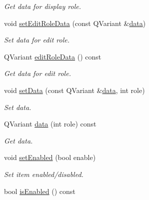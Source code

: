 \begin{DoxyCompactItemize}
\begin{DoxyCompactList}\small\item\em Get data for display role. \end{DoxyCompactList}\item 
void \hyperlink{class_mdt_1_1_item_model_1_1_variant_table_model_item_a10f83fac7538e913d9af5be304efd0ad}{set\+Edit\+Role\+Data} (const Q\+Variant \&\hyperlink{class_mdt_1_1_item_model_1_1_variant_table_model_item_af4c895c68f47b19a07e159325a31fbf3}{data})
\begin{DoxyCompactList}\small\item\em Set data for edit role. \end{DoxyCompactList}\item 
Q\+Variant \hyperlink{class_mdt_1_1_item_model_1_1_variant_table_model_item_a597cfa2f4f45268d09b8464f441ab44a}{edit\+Role\+Data} () const 
\begin{DoxyCompactList}\small\item\em Get data for edit role. \end{DoxyCompactList}\item 
void \hyperlink{class_mdt_1_1_item_model_1_1_variant_table_model_item_a1421ef37bdea6f7d8ca8843dd46e4063}{set\+Data} (const Q\+Variant \&\hyperlink{class_mdt_1_1_item_model_1_1_variant_table_model_item_af4c895c68f47b19a07e159325a31fbf3}{data}, int role)
\begin{DoxyCompactList}\small\item\em Set data. \end{DoxyCompactList}\item 
Q\+Variant \hyperlink{class_mdt_1_1_item_model_1_1_variant_table_model_item_af4c895c68f47b19a07e159325a31fbf3}{data} (int role) const 
\begin{DoxyCompactList}\small\item\em Get data. \end{DoxyCompactList}\item 
void \hyperlink{class_mdt_1_1_item_model_1_1_variant_table_model_item_a79cd7d959040926f118d26f263d4700f}{set\+Enabled} (bool enable)
\begin{DoxyCompactList}\small\item\em Set item enabled/disabled. \end{DoxyCompactList}\item 
bool \hyperlink{class_mdt_1_1_item_model_1_1_variant_table_model_item_ad4d061ed7bef5691befc2c4986d72f4b}{is\+Enabled} () const \hypertarget{class_mdt_1_1_item_model_1_1_variant_table_model_item_ad4d061ed7bef5691befc2c4986d72f4b}{}\label{class_mdt_1_1_item_model_1_1_variant_table_model_item_ad4d061ed7bef5691befc2c4986d72f4b}


\end{DoxyCompactItemize}
